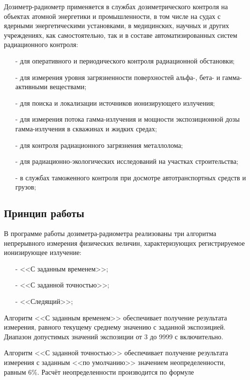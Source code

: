     Дозиметр-радиометр применяется в службах дозиметрического контроля на объектах 
    атомной энергетики и промышленности, в том числе на судах с ядерными энергетическими 
    установками, в медицинских, научных и других учреждениях, как самостоятельно, так 
    и в составе автоматизированных систем радиационного контроля:
    \begin{itemize}
    	\item[-] для оперативного и периодического контроля радиационной обстановки;
    	\item[-] для измерения уровня загрязненности поверхностей альфа-, бета- и 
    		гамма- активными веществами;
    	\item[-] для поиска и локализации источников ионизирующего излучения;
    	\item[-] для измерения потока гамма-излучения и мощности экспозиционной дозы 
    		гамма-излучения в скважинах и жидких средах;
    	\item[-] для контроля радиационного загрязнения металлолома;
    	\item[-] для радиационно-экологических исследований на участках строительства;
    	\item[-] в службах таможенного контроля при досмотре автотранспортных 
    		средств и грузов;
    \end{itemize}

\subsection{Принцип работы} \label{subsect2_2_3}
	В программе работы дозиметра-радиометра реализованы три алгоритма непрерывного 
	измерения физических величин, характеризующих регистрируемое ионизирующее 
	излучение:
	\begin{itemize}
		\item[-] <<С заданным временем>>;
		\item[-] <<С заданной точностью>>;
		\item[-] <<Следящий>>;
	\end{itemize}

	Алгоритм <<С заданным временем>> обеспечивает получение результата измерения, 
	равного текущему среднему значению с заданной экспозицией. Диапазон 
	допустимых значений экспозиции от 3 до 9999 с включительно.

	Алгоритм <<С заданной точностью>> обеспечивает получение результата 
	измерения с заданным <<по умолчанию>> значением неопределенности, равным 
	6\%. Расчёт неопределенности производится по формуле

